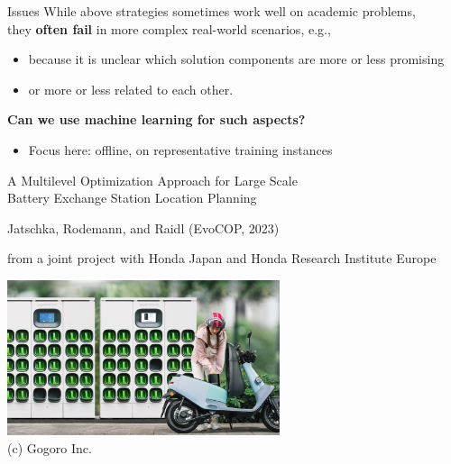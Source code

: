 \documentclass[aspectratio=1610]{beamer}
\newcommand{\important}[1]{{\color{green!60!black}#1}}
\begin{document}
\begin{frame}{Issues}
	While above strategies sometimes work well on academic problems,\\ they \alert{{\bf often fail} in more complex real-world scenarios}, e.g.,
	
	\bigskip
	\begin{itemize}
		\itemsep2ex
		\item because it is \alert{unclear which solution components are more or less promising}
		\item or \alert{more or less related to each other}. 
	\end{itemize}

	\vspace{1cm}
	\important{\bf Can we use machine learning for such aspects?}
	\begin{itemize}
		\item Focus here: offline, on representative training instances
	\end{itemize}
\end{frame}



\begin{frame}{A Multilevel Optimization Approach for
	Large Scale\\ Battery Exchange Station Location Planning}

Jatschka, Rodemann, and Raidl (EvoCOP, 2023) \cite{jatschka-23}

\medskip
from a joint project with Honda Japan and Honda Research Institute Europe

\bigskip
\begin{center}
	\includegraphics[width=0.6\textwidth]{graphics/Gogoro_Swapping_Station.jpg}\\
	{\small (c) Gogoro Inc.}
\end{center}
\end{frame}
\end{document}
